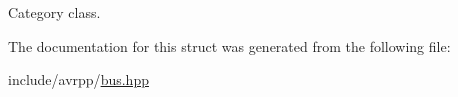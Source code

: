 Category class. 



The documentation for this struct was generated from the following file:\begin{DoxyCompactItemize}
\item 
include/avrpp/\hyperlink{bus_8hpp}{bus.hpp}\end{DoxyCompactItemize}

